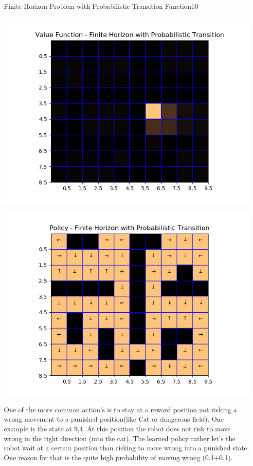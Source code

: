 \begin{questions}
\begin{question}{Finite Horizon Problem with Probabilistic Transition Function}{10}
\begin{answer}
		\noindent\begin{minipage}{.5\textwidth}
			\centering
			\includegraphics[width=1\textwidth]{img/value_2d.png} 
			\label{fig:2d1}            
		\end{minipage}%
		\begin{minipage}{.5\textwidth}
			\centering
			\includegraphics[width=1\textwidth]{img/policy_2d.png} 
			\label{fig:2d2}               
		\end{minipage}
	One of the more common action's is to stay at a reward position not risking a wrong movement to a punished position(like Cat or dangerous field). One example is the state at 9,4. At this position the robot does not risk to move wrong in the right direction (into the cat). The learned policy rather let's the robot wait at a certain position than risking to move wrong into a punished state. One reason for that is the quite high probability of moving wrong (0.1+0.1).
	

\end{answer}
\end{question}
\end{questions}
